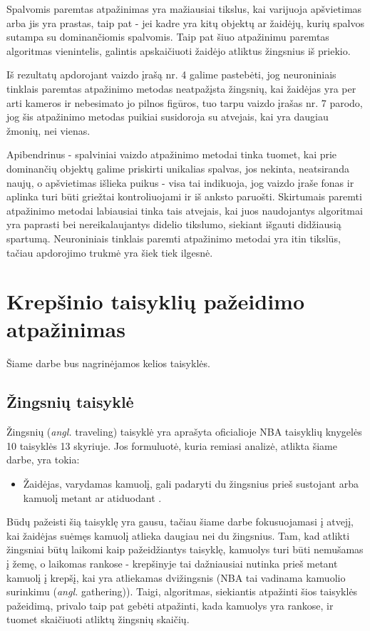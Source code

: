 \documentclass{VUMIFPSbakalaurinis}
\begin{document}
Spalvomis paremtas atpažinimas yra mažiausiai tikslus, kai varijuoja apšvietimas arba jis yra prastas, taip pat - jei kadre yra kitų objektų ar žaidėjų, kurių spalvos sutampa su dominančiomis spalvomis. Taip pat šiuo atpažinimu paremtas algoritmas vienintelis, galintis apskaičiuoti žaidėjo atliktus žingsnius iš priekio. 

Iš rezultatų apdorojant vaizdo įrašą nr. 4 galime pastebėti, jog neuroniniais tinklais paremtas atpažinimo metodas neatpažįsta žingsnių, kai žaidėjas yra per arti kameros ir nebesimato jo pilnos figūros, tuo tarpu vaizdo įrašas nr. 7 parodo, jog šis atpažinimo metodas puikiai susidoroja su atvejais, kai yra daugiau žmonių, nei vienas. 

Apibendrinus - spalviniai vaizdo atpažinimo metodai tinka tuomet, kai prie dominančių objektų galime priskirti unikalias spalvas, jos nekinta, neatsiranda naujų, o apšvietimas išlieka puikus - visa tai indikuoja, jog vaizdo įraše fonas ir aplinka turi būti griežtai kontroliuojami ir iš anksto paruošti. Skirtumais paremti atpažinimo metodai labiausiai tinka tais atvejais, kai juos naudojantys algoritmai yra paprasti bei nereikalaujantys didelio tikslumo, siekiant išgauti didžiausią spartumą. Neuroniniais tinklais paremti atpažinimo metodai yra itin tikslūs, tačiau apdorojimo trukmė yra šiek tiek ilgesnė.

\section{Krepšinio taisyklių pažeidimo atpažinimas}

Šiame darbe bus nagrinėjamos kelios taisyklės.

\subsection{Žingsnių taisyklė}
Žingsnių (\textit{angl.} traveling) taisyklė yra aprašyta oficialioje NBA taisyklių knygelės 10 taisyklės 13 skyriuje. Jos formuluotė, kuria remiasi analizė, atlikta šiame darbe, yra tokia: 

\begin{itemize}
	\item Žaidėjas, varydamas kamuolį, gali padaryti du žingsnius prieš sustojant arba kamuolį metant ar atiduodant \cite{nba-rules}. 
\end{itemize}

Būdų pažeisti šią taisyklę yra gausu, tačiau šiame darbe fokusuojamasi į atvejį, kai žaidėjas suėmęs kamuolį atlieka daugiau nei du žingsnius. Tam, kad atlikti žingsniai būtų laikomi kaip pažeidžiantys taisyklę, kamuolys turi būti nemušamas į žemę, o laikomas rankose - krepšinyje tai dažniausiai nutinka prieš metant kamuolį į krepšį, kai yra atliekamas dvižingsnis (NBA tai vadinama kamuolio surinkimu (\textit{angl.} gathering)). Taigi, algoritmas, siekiantis atpažinti šios taisyklės pažeidimą, privalo taip pat gebėti atpažinti, kada kamuolys yra rankose, ir tuomet skaičiuoti atliktų žingsnių skaičių. 
\end{document}
